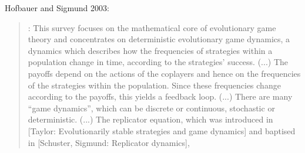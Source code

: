 \documentclass[a4paper,10pt]{article}
\begin{document}
Hofbauer and Sigmund 2003:
\begin{quotation} \cite{hofbauer2003-evolutionaryGameDynamics}:
    This survey focuses on the mathematical core of evolutionary game theory and concentrates on deterministic evolutionary game dynamics, a dynamics which describes how the frequencies of strategies within a population change in time, according to the strategies' success.
    (...)
    The payoffs depend on the actions of the coplayers and hence on the frequencies of the strategies within the population. Since these frequencies change according to the payoffs, this yields a feedback loop.
    (...)
    There are many ``game dynamics'', which can be discrete or continuous, stochastic or deterministic.
    (...)
    The replicator equation, which was introduced in [Taylor: Evolutionarily stable strategies and game dynamics] and baptised in [Schuster, Sigmund: Replicator dynamics],
\end{quotation}


\\
\end{document}
